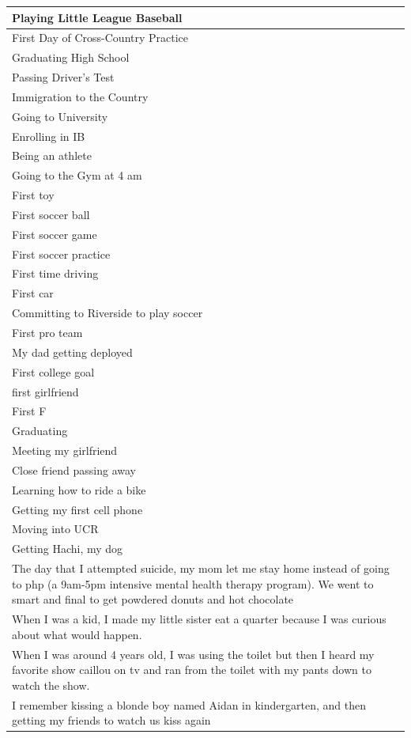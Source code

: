 \documentclass[
  .7em,
  letterpaper,
  DIV=11,
  numbers=noendperiod]{scrartcl}
\begin{document}
\begin{table}
\begin{tabular}{l}
\hline
Playing Little League Baseball\\
\hline
First Day of Cross-Country Practice\\
\hline
Graduating High School\\
\hline
Passing Driver's Test\\
\hline
Immigration to the Country\\
\hline
Going to University\\
\hline
Enrolling in IB\\
\hline
Being an athlete\\
\hline
Going to the Gym at 4 am\\
\hline
First toy\\
\hline
First soccer ball\\
\hline
First soccer game\\
\hline
First soccer practice\\
\hline
First time driving\\
\hline
First car\\
\hline
Committing to Riverside to play soccer\\
\hline
First pro team\\
\hline
My dad getting deployed\\
\hline
First college goal\\
\hline
first girlfriend\\
\hline
First F\\
\hline
Graduating\\
\hline
Meeting my girlfriend\\
\hline
Close friend passing away\\
\hline
Learning how to ride a bike\\
\hline
Getting my first cell phone\\
\hline
Moving into UCR\\
\hline
Getting Hachi, my dog\\
\hline
The day that I attempted suicide, my mom let me stay home instead of going to php (a 9am-5pm intensive mental health therapy program). We went to smart and final to get powdered donuts and hot chocolate\\
\hline
When I was a kid, I made my little sister eat a quarter because I was curious about what would happen.\\
\hline
When I was around 4 years old, I was using the toilet but then I heard my favorite show caillou on tv and ran from the toilet with my pants down to watch the show.\\
\hline
I remember kissing a blonde boy named Aidan in kindergarten, and then getting my friends to watch us kiss again\\

\end{tabular}
\end{table}
\end{document}
